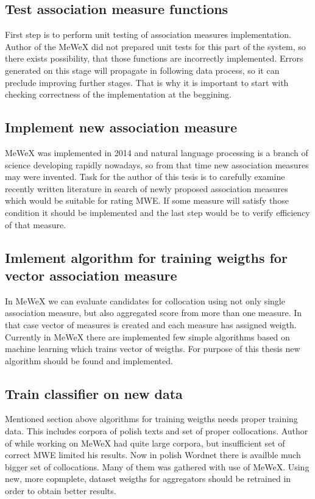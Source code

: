 \subsection{Test association measure functions}
First step is to perform unit testing of association measures implementation. Author of the MeWeX did not prepared unit tests for this part of the system, 
so there exists possibility, that those functions are incorrectly implemented. Errors generated on this stage will propagate in following data process, 
so it can preclude improving further stages. That is why it is important to start with checking correctness of the implementation 
at the beggining.

\subsection{Implement new association measure}
MeWeX was implemented in 2014 and natural language processing is a branch of science developing rapidly nowadays, 
so from that time new association measures may were invented. Task for the author of this tesis is to carefully examine recently written literature 
in search of newly proposed association measures which would be suitable for rating MWE. If some measure will satisfy those condition it should 
be implemented and the last step would be to verify efficiency of that measure.

\subsection{Imlement algorithm for training weigths for vector association measure}
In MeWeX we can evaluate candidates for collocation using not only single association measure, but also aggregated score from more than one measure. 
In that case vector of measures is created and each measure has assigned weigth. Currently in MeWeX there are implemented few simple algorithms 
based on machine learning which trains vector of weigths. For purpose of this thesis new algorithm should be found and implemented.

\subsection{Train classifier on new data}
Mentioned section above algorithms for training weigths needs proper training data. This includes corpora of polish texts and set 
of proper collocations. Author of \cite{mgr} while working on MeWeX had quite large corpora, but insufficient set of correct MWE limited his results. 
Now in polish Wordnet there is availble much bigger set of collocations. Many of them was gathered with use of MeWeX.
Using new, more copmplete, dataset weigths for aggregators should be retrained in order to obtain better results.

